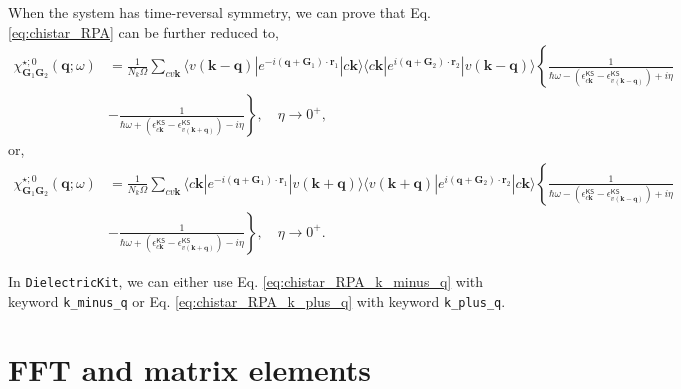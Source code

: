 \documentclass[11pt, oneside]{article}          %
\begin{document}
When the system has time-reversal symmetry, we can prove that Eq. \eqref{eq:chistar_RPA} can be further reduced to,
\begin{equation}
  \label{eq:chistar_RPA_k_minus_q}
  \begin{aligned}
    \chi^{\star;0}_{{\bm G}_1 {\bm G}_2} ({\bm q}; \omega) & = \frac{1}{N_k \Omega} \sum_{c v {\bm k}} \langle v ({\bm k} - {\bm q}) | e^{-i ({\bm q} + {\bm G}_1) \cdot {\bm r}_1} | c {\bm k} \rangle \langle c {\bm k} | e^{i ({\bm q} + {\bm G}_2) \cdot {\bm r}_2} | v ({\bm k} - {\bm q}) \rangle \left \{ \frac{1}{\hbar \omega - (\epsilon^{\mathsf{KS}}_{c {\bm k}} - \epsilon^{\mathsf{KS}}_{v ({\bm k} - {\bm q})}) + i \eta} \right . \\
    & \left . - \frac{1}{\hbar \omega + (\epsilon^{\mathsf{KS}}_{c {\bm k}} - \epsilon^{\mathsf{KS}}_{v ({\bm k} + {\bm q})}) - i \eta} \right \}, \quad \eta \rightarrow 0^{+},
  \end{aligned}
\end{equation}
or,
\begin{equation}
  \label{eq:chistar_RPA_k_plus_q}
  \begin{aligned}
    \chi^{\star;0}_{{\bm G}_1 {\bm G}_2} ({\bm q}; \omega) & = \frac{1}{N_k \Omega} \sum_{c v {\bm k}} \langle c {\bm k} | e^{-i ({\bm q} + {\bm G}_1)\cdot {\bm r}_1} | v ({\bm k} + {\bm q}) \rangle \langle v ({\bm k} + {\bm q}) | e^{i({\bm q} + {\bm G}_2) \cdot {\bm r}_2} | c {\bm k} \rangle \left \{ \frac{1}{\hbar \omega - (\epsilon^{\mathsf{KS}}_{c {\bm k}} - \epsilon^{\mathsf{KS}}_{v ({\bm k} - {\bm q})}) + i \eta} \right . \\
    & \left . - \frac{1}{\hbar \omega + (\epsilon^{\mathsf{KS}}_{c {\bm k}} - \epsilon^{\mathsf{KS}}_{v ({\bm k} + {\bm q})}) - i \eta} \right \}, \quad \eta \rightarrow 0^{+}.
  \end{aligned}
\end{equation}

In {\tt DielectricKit}, we can either use Eq. \eqref{eq:chistar_RPA_k_minus_q} with keyword {\tt k\_minus\_q} or Eq. \eqref{eq:chistar_RPA_k_plus_q} with keyword {\tt k\_plus\_q}.

\section{FFT and matrix elements}
\label{sec:fft-matrix-elements}
\end{document}
